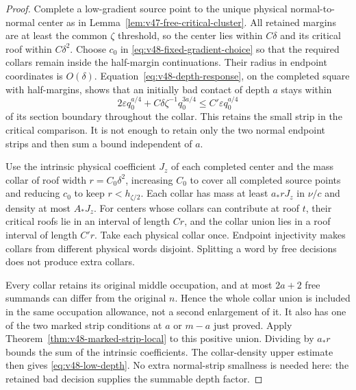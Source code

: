 \begin{proof}
Complete a low-gradient source point to the unique physical
normal-to-normal center as in Lemma~\ref{lem:v47-free-critical-cluster}.
All retained margins are at least the common $\zeta$ threshold, so
the center lies within $C\delta$ and its critical roof within
$C\delta^2$. Choose $c_0$ in \eqref{eq:v48-fixed-gradient-choice}
so that the required collars remain inside the half-margin
continuations. Their radius in endpoint coordinates is $O(\delta)$.
Equation~\eqref{eq:v48-depth-response}, on the completed square with
half-margins, shows that an initially bad contact of depth $a$ stays
within
\[
 2\varepsilon q_0^{a/4}
       +C\delta\zeta^{-1}q_0^{3a/4}
           \le C'\varepsilon q_0^{a/4}
\]
of its section boundary throughout the collar. This retains the small
strip in the critical comparison. It is not enough to retain only the
two normal endpoint strips and then sum a bound independent of $a$.

Use the intrinsic physical coefficient $J_z$ of each completed center
and the mass collar of roof width $r=C_0\delta^2$, increasing $C_0$
to cover all completed source points and reducing $c_0$ to keep
$r<h_{\zeta/2}$. Each collar has mass at least $a_*rJ_z$ in
$\nu/c$ and density at most $A_*J_z$. For centers whose collars can
contribute at roof $t$, their critical roofs lie in an interval of
length $Cr$, and the collar union lies in a roof interval of length
$C'r$. Take each physical collar once. Endpoint injectivity makes
collars from different physical words disjoint. Splitting a word by
free decisions does not produce extra collars.

Every collar retains its original middle occupation, and at most
$2a+2$ free summands can differ from the original $n$. Hence the
whole collar union is included in the same occupation allowance,
not a second enlargement of it. It also has one of the two marked
strip conditions at $a$ or $m-a$ just proved. Apply
Theorem~\ref{thm:v48-marked-strip-local} to this positive union.
Dividing by $a_*r$ bounds the sum of the intrinsic coefficients.
The collar-density upper estimate then gives
\eqref{eq:v48-low-depth}. No extra normal-strip smallness is needed
here: the retained bad decision supplies the summable depth factor.
\end{proof}

